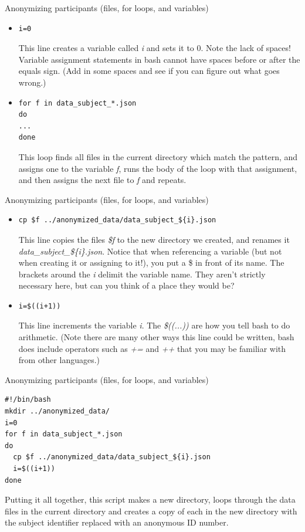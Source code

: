 \documentclass{beamer}
\begin{document}
\begin{frame}[fragile]{Anonymizing participants (files, for loops, and variables)}
\begin{itemize}
\item<1->
\begin{lstlisting}
i=0
\end{lstlisting} 
This line creates a variable called \emph{i} and sets it to 0. Note the lack of spaces! Variable assignment statements in bash cannot have spaces before or after the equals sign. (Add in some spaces and see if you can figure out what goes wrong.)
\item<2->
\begin{lstlisting}
for f in data_subject_*.json
do
...
done
\end{lstlisting} 
This loop finds all files in the current directory which match the pattern, and assigns one to the variable \emph{f}, runs the body of the loop with that assignment, and then assigns the next file to \emph{f} and repeats. 
\end{itemize}
\end{frame}

\begin{frame}[fragile]{Anonymizing participants (files, for loops, and variables)}
\begin{itemize}
\item<1->
\begin{lstlisting}
cp $f ../anonymized_data/data_subject_${i}.json
\end{lstlisting} 
This line copies the files \emph{\$f} to the new directory we created, and renames it \emph{data\_subject\_\$\{i\}.json}. Notice that when referencing a variable (\alert{but not when creating it or assigning to it!}), you put a \$ in front of its name. The brackets around the \emph{i} delimit the variable name. They aren't strictly necessary here, but can you think of a place they would be?
\item<2->
\begin{lstlisting}
i=$((i+1))
\end{lstlisting} 
This line increments the variable \emph{i}. The \emph{\$((...))} are how you tell bash to do arithmetic. (Note there are many other ways this line could be written, bash does include operators such as \emph{+=} and \emph{++} that you may be familiar with from other languages.)
\end{itemize}
\end{frame}

\begin{frame}[fragile]{Anonymizing participants (files, for loops, and variables)}
\begin{lstlisting}[title=anonymize.sh]
#!/bin/bash
mkdir ../anonymized_data/
i=0
for f in data_subject_*.json
do
  cp $f ../anonymized_data/data_subject_${i}.json
  i=$((i+1))
done
\end{lstlisting}
Putting it all together, this script makes a new directory, loops through the data files in the current directory and creates a copy of each in the new directory with the subject identifier replaced with an anonymous ID number.
\end{frame}
\end{document}

